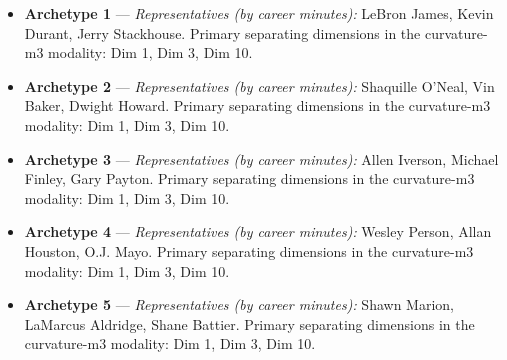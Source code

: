 \begin{itemize}
\item \textbf{Archetype 1} --- \emph{Representatives (by career minutes):} LeBron James, Kevin Durant, Jerry Stackhouse. Primary separating dimensions in the curvature-m3 modality: Dim 1, Dim 3, Dim 10.
\item \textbf{Archetype 2} --- \emph{Representatives (by career minutes):} Shaquille O'Neal, Vin Baker, Dwight Howard. Primary separating dimensions in the curvature-m3 modality: Dim 1, Dim 3, Dim 10.
\item \textbf{Archetype 3} --- \emph{Representatives (by career minutes):} Allen Iverson, Michael Finley, Gary Payton. Primary separating dimensions in the curvature-m3 modality: Dim 1, Dim 3, Dim 10.
\item \textbf{Archetype 4} --- \emph{Representatives (by career minutes):} Wesley Person, Allan Houston, O.J. Mayo. Primary separating dimensions in the curvature-m3 modality: Dim 1, Dim 3, Dim 10.
\item \textbf{Archetype 5} --- \emph{Representatives (by career minutes):} Shawn Marion, LaMarcus Aldridge, Shane Battier. Primary separating dimensions in the curvature-m3 modality: Dim 1, Dim 3, Dim 10.
\end{itemize}
